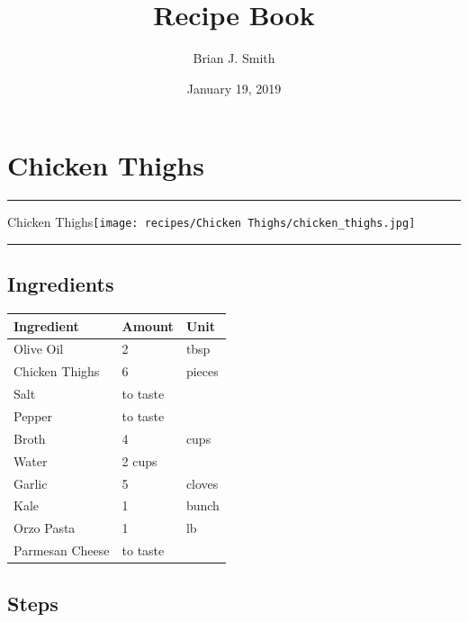 \documentclass[11pt,]{article}
\title{Recipe Book}
\author{Brian J. Smith}
\date{January 19, 2019}
\begin{document}
\maketitle

{
\setcounter{tocdepth}{1}
\tableofcontents
}
\break 

\section{Chicken Thighs}\label{chicken-thighs}

\hrule  \vspace{5 mm}

\HUGE Chicken
Thighs\normalsize \hfill \texttt{[image: recipes/Chicken Thighs/chicken\_thighs.jpg]}

\vspace{5 mm} \hrule 

\subsection{Ingredients}\label{ingredients}

\begin{tabular}{l|l|l}
\hline
Ingredient & Amount & Unit\\
\hline
Olive Oil & 2 & tbsp\\
\hline
Chicken Thighs & 6 & pieces\\
\hline
Salt & to taste & \\
\hline
Pepper & to taste & \\
\hline
Broth & 4 & cups\\
\hline
Water & 2 cups & \\
\hline
Garlic & 5 & cloves\\
\hline
Kale & 1 & bunch\\
\hline
Orzo Pasta & 1 & lb\\
\hline
Parmesan Cheese & to taste & \\
\hline
\end{tabular}

\subsection{Steps}\label{steps}
\end{document}
